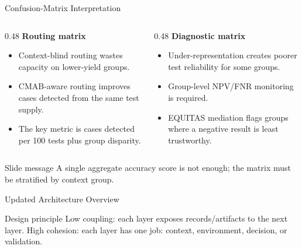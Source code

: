 \documentclass[aspectratio=169,10pt]{beamer}
\begin{document}
\begin{frame}{Confusion-Matrix Interpretation}
\begin{columns}[T]
\begin{column}{0.48\textwidth}
\textbf{Routing matrix}
\begin{itemize}
    \item Context-blind routing wastes capacity on lower-yield groups.
    \item CMAB-aware routing improves cases detected from the same test supply.
    \item The key metric is cases detected per 100 tests plus group disparity.
\end{itemize}
\end{column}
\begin{column}{0.48\textwidth}
\textbf{Diagnostic matrix}
\begin{itemize}
    \item Under-representation creates poorer test reliability for some groups.
    \item Group-level NPV/FNR monitoring is required.
    \item EQUITAS mediation flags groups where a negative result is least trustworthy.
\end{itemize}
\end{column}
\end{columns}
\begin{block}{Slide message}
A single aggregate accuracy score is not enough; the matrix must be stratified by context group.
\end{block}
\end{frame}

\begin{frame}{Updated Architecture Overview}
\begin{center}
\end{center}
\begin{block}{Design principle}
Low coupling: each layer exposes records/artifacts to the next layer. High cohesion: each layer has one job: context, environment, decision, or validation.
\end{block}
\end{frame}
\end{document}
